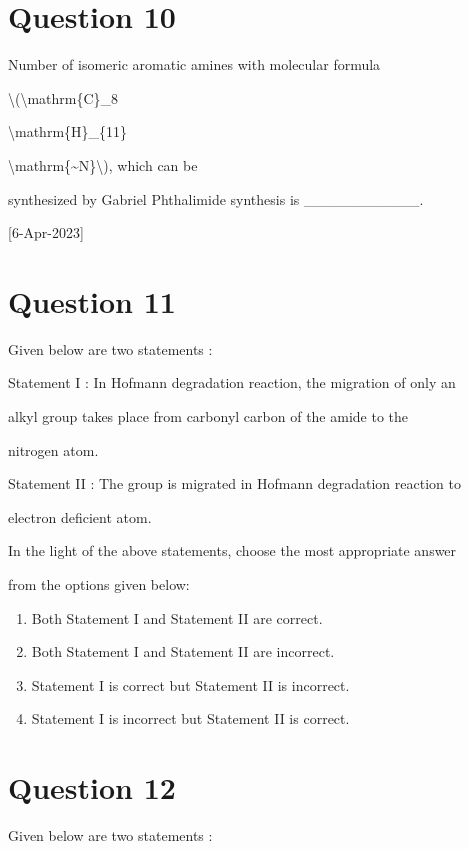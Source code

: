 \documentclass{article}
\begin{document}
\section*{Question 10}
Number of isomeric aromatic amines with molecular formula

\textbackslash(\textbackslash mathrm\{C\}\_8

\textbackslash mathrm\{H\}\_\{11\}

\textbackslash mathrm\{\textasciitilde N\}\textbackslash), which can be

synthesized by Gabriel Phthalimide synthesis is \_\_\_\_\_\_\_\_\_\_\_.~

{[}6-Apr-2023{]}


\begin{enumerate}[label=(\alph*)]
\end{enumerate}
\newpage
\section*{Question 11}
Given below are two statements :



Statement I : In Hofmann degradation reaction, the migration of only an

alkyl group takes place from carbonyl carbon of the amide to the

nitrogen atom.



Statement II : The group is migrated in Hofmann degradation reaction to

electron deficient atom.



In the light of the above statements, choose the most appropriate answer

from the options given below:


\begin{enumerate}[label=(\alph*)]
\item Both Statement I and Statement II are correct.


\item Both Statement I and Statement II are incorrect.


\item Statement I is correct but Statement II is incorrect.


\item Statement I is incorrect but Statement II is correct.


\end{enumerate}
\newpage
\section*{Question 12}
Given below are two statements :
\end{document}
